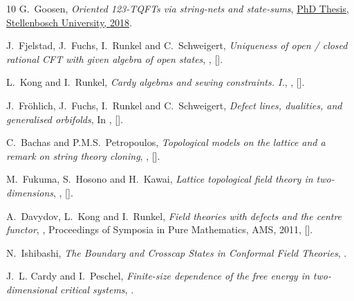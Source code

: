 \begin{thebibliography}{10}
G.~Goosen,
\textit{Oriented 123-TQFTs via string-nets and state-sums}, 
\href{http://hdl.handle.net/10019.1/103324}{PhD Thesis, Stellenbosch University, 2018}.

J.~Fjelstad, J.~Fuchs, I.~Runkel and C.~Schweigert,
\textit{Uniqueness of open / closed rational CFT with given algebra of open states},
,
[].

L.~Kong and I.~Runkel,
\textit{Cardy algebras and sewing constraints. I.},
,
[].

J.~Fr\"ohlich, J.~Fuchs, I.~Runkel and C.~Schweigert,
\textit{Defect lines, dualities, and generalised orbifolds},
In ,
[].

C.~Bachas and P.M.S.~Petropoulos,
\textit{Topological models on the lattice and a remark on string theory cloning},
,
[].

M.~Fukuma, S.~Hosono and H.~Kawai,
\textit{Lattice topological field theory in two-dimensions},
,
[].

A.~Davydov, L.~Kong and I.~Runkel,
\textit{Field theories with defects and the centre functor},
, Proceedings of Symposia in Pure Mathematics, AMS, 2011, [].

N.~Ishibashi,
\textit{The Boundary and Crosscap States in Conformal Field Theories},
.

J.~L. Cardy and I.~Peschel,
\textit{Finite-size dependence of the free energy in two-dimensional critical systems},
.


\end{thebibliography}
